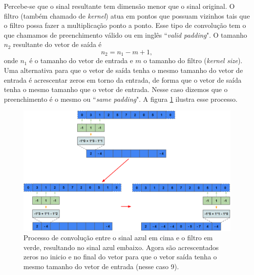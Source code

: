 \documentclass[a4paper,12pt,oneside]{book}
\begin{document}
\par Percebe-se que o sinal resultante tem dimensão menor que o sinal original. O filtro (também chamado de \textit{kernel}) atua em pontos que possuam vizinhos tais que o filtro possa fazer a multiplicação ponto a ponto. Esse tipo de convolução tem o que chamamos de preenchimento válido ou em inglês ``\textit{valid padding}". O tamanho $n_2$ resultante do vetor de saída é 
\begin{equation}
    n_2 = n_1 - m + 1,
\end{equation}
%
onde $n_1$ é o tamanho do vetor de entrada e $m$ o tamanho do filtro (\textit{kernel size}). Uma alternativa para que o vetor de saída tenha o mesmo tamanho do vetor de entrada é acrescentar zeros em torno da entrada, de forma que o vetor de saída tenha o mesmo tamanho que o vetor de entrada. Nesse caso dizemos que o preenchimento é o mesmo ou ``\textit{same padding}". A figura \ref{fig:conv_same} ilustra esse processo.

\begin{figure}[H]
    \centering
    \includegraphics[scale = 0.38]{figs/conv_same.png}
    \caption{Processo de convolução entre o sinal azul em cima e o filtro em verde, resultando no sinal azul embaixo. Agora são acrescentados zeros no inicio e no final do vetor para que o vetor saída tenha o mesmo tamanho do vetor de entrada (nesse caso 9).}
    \label{fig:conv_same}
\end{figure}

\end{document}
